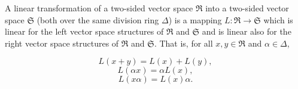 A linear transformation of a two-sided vector space $\mathfrak{R}$ into a two-sided vector space $\mathfrak{S}$ (both over the same division ring $\Delta$) is a mapping $L: \mathfrak{R} \to \mathfrak{S}$ which is linear for the left vector space structures of $\mathfrak{R}$ and $\mathfrak{S}$ and is linear also for the right vector space structures of $\mathfrak{R}$ and $\mathfrak{S}$. That is, for all $x, y \in \mathfrak{R}$ and $\alpha \in \Delta$,

$$L(x + y) = L(x) + L(y),$$
$$L(\alpha x) = \alpha L(x),$$
$$L(x \alpha) = L(x) \alpha.$$
